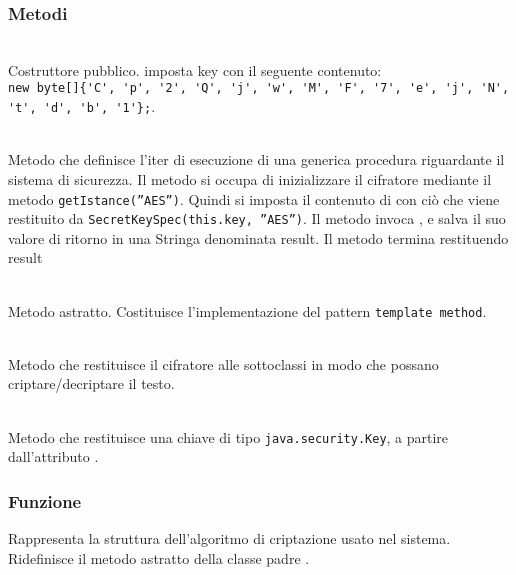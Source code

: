 \subsubsection*{Metodi}
\begin{description}

	\item{}\\
	Costruttore pubblico. imposta key con il seguente contenuto:\\
	\verb|new byte[]{'C', 'p', '2', 'Q', 'j', 'w', 'M', 'F', '7', 'e', 'j', 'N', 't', 'd', 'b', '1'};|.

	\item{}\\
	Metodo che definisce l'iter di esecuzione di una generica procedura riguardante il sistema di sicurezza. Il metodo si occupa di inizializzare il cifratore  mediante il metodo \texttt{getIstance(''AES'')}. Quindi si imposta il contenuto di  con ciò che viene restituito da \texttt{SecretKeySpec(this.key, ''AES'')}. Il metodo invoca , e salva il suo valore di ritorno in una Stringa denominata result. Il metodo termina restituendo result

	\item{}\\
	Metodo astratto. Costituisce l'implementazione del pattern \texttt{template method}.

	\item{}\\
	Metodo che restituisce il cifratore  alle sottoclassi in modo che possano criptare/decriptare il testo.

	\item{}\\
	Metodo che restituisce una chiave di tipo \texttt{java.security.Key}, a partire dall'attributo .
	
\end{description}


\subsubsection*{Funzione}
Rappresenta la struttura dell'algoritmo di criptazione usato nel sistema. Ridefinisce il metodo astratto  della classe padre .

